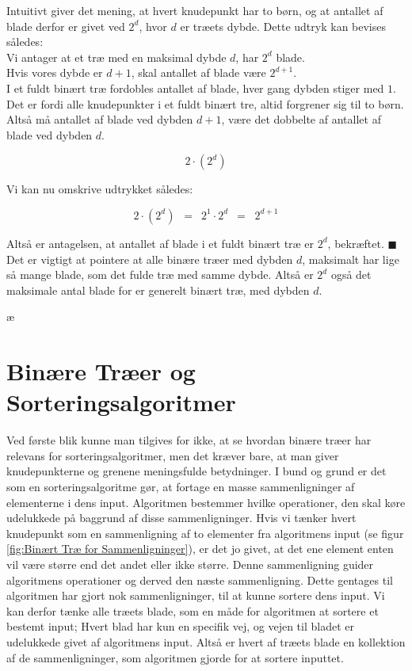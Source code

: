Intuitivt giver det mening, at hvert knudepunkt har to børn, og at antallet af blade derfor er givet ved $2^d$, hvor $d$ er træets dybde. Dette udtryk kan bevises således:\\

Vi antager at et træ med en maksimal dybde $d$, har $2^d$ blade.\\

Hvis vores dybde er $d + 1$, skal antallet af blade være $2^{d+1}$.\\

I et fuldt binært træ fordobles antallet af blade, hver gang dybden stiger med $1$. Det er fordi alle knudepunkter i et fuldt binært tre, altid forgrener sig til to børn. Altså må antallet af blade ved dybden $d+1$, være det dobbelte af antallet af blade ved dybden $d$.

$$2\cdot (2^d)$$

Vi kan nu omskrive udtrykket således:

$$2\cdot (2^d) \,\,\,=\,\,\, 2^1 \cdot 2^d \,\,\,=\,\,\ 2^{d+1}$$

Altså er antagelsen, at antallet af blade i et fuldt binært træ er $2^d$, bekræftet. $\blacksquare$\\

Det er vigtigt at pointere at alle binære træer med dybden $d$, maksimalt har lige så mange blade, som det fulde træ med samme dybde. Altså er $2^d$ også det maksimale antal blade for er generelt binært træ, med dybden $d$.

æ

\section{Binære Træer og Sorteringsalgoritmer}
\label{sec:Binære Træer og Sorteringsalgoritmer}

Ved første blik kunne man tilgives for ikke, at se hvordan binære træer har relevans for sorteringsalgoritmer, men det kræver bare, at man giver knudepunkterne og grenene meningsfulde betydninger. I bund og grund er det som en sorteringsalgoritme gør, at fortage en masse sammenligninger af elementerne i dens input. Algoritmen bestemmer hvilke operationer, den skal køre udelukkede på baggrund af disse sammenligninger. Hvis vi tænker hvert knudepunkt som en sammenligning af to elementer fra algoritmens input (se figur \ref{fig:Binært Træ for Sammenligninger}), er det jo givet, at det ene element enten vil være større end det andet eller ikke større. Denne sammenligning guider algoritmens operationer og derved den næste sammenligning. Dette gentages til algoritmen har gjort nok sammenligninger, til at kunne sortere dens input. Vi kan derfor tænke alle træets blade, som en måde for algoritmen at sortere et bestemt input; Hvert blad har kun en specifik vej, og vejen til bladet er udelukkede givet af algoritmens input. Altså er hvert af træets blade en kollektion af de sammenligninger, som algoritmen gjorde for at sortere inputtet. \cite[s. 109]{aogd}


